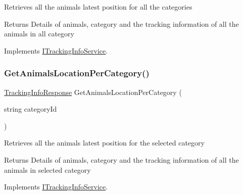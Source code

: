 Retrieves all the animal\textquotesingle{}s latest position for all the categories 

\begin{DoxyReturn}{Returns}
Details of animals, category and the tracking information of all the animals in all category
\end{DoxyReturn}


Implements \hyperlink{interfaceWildLifeTracker_1_1Services_1_1ITrackingInfoService_a858073f81f74fcdf93b69fe464b13e84}{I\+Tracking\+Info\+Service}.

\mbox{\label{classWildLifeTracker_1_1Services_1_1TrackingInfoService_af4b4cf67d3e3a8ec3e01041262c8f13a}} 
\subsubsection{\texorpdfstring{Get\+Animals\+Location\+Per\+Category()}{GetAnimalsLocationPerCategory()}}
{\footnotesize\ttfamily \hyperlink{classWildLifeTracker_1_1Response_1_1TrackingInfoResponse}{Tracking\+Info\+Response} Get\+Animals\+Location\+Per\+Category (\begin{DoxyParamCaption}\item[{string}]{category\+Id }\end{DoxyParamCaption})\hspace{0.3cm}{\ttfamily [inline]}}



Retrieves all the animal\textquotesingle{}s latest position for the selected category 

\begin{DoxyReturn}{Returns}
Details of animals, category and the tracking information of all the animals in selected category
\end{DoxyReturn}


Implements \hyperlink{interfaceWildLifeTracker_1_1Services_1_1ITrackingInfoService_af4b4cf67d3e3a8ec3e01041262c8f13a}{I\+Tracking\+Info\+Service}.



